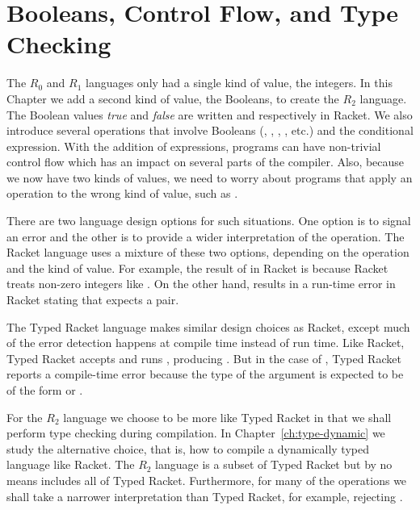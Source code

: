 \documentclass[11pt]{book}
\begin{document}
\chapter{Booleans, Control Flow, and Type Checking}
\label{ch:bool-types}

The $R_0$ and $R_1$ languages only had a single kind of value, the
integers. In this Chapter we add a second kind of value, the Booleans,
to create the $R_2$ language. The Boolean values \emph{true} and
\emph{false} are written  and  respectively in
Racket.  We also introduce several operations that involve Booleans
(, , , \key{<}, etc.) and the conditional
 expression. With the addition of  expressions,
programs can have non-trivial control flow which has an impact on
several parts of the compiler. Also, because we now have two kinds of
values, we need to worry about programs that apply an operation to the
wrong kind of value, such as .

There are two language design options for such situations.  One option
is to signal an error and the other is to provide a wider
interpretation of the operation. The Racket language uses a mixture of
these two options, depending on the operation and the kind of
value. For example, the result of  in Racket is
 because Racket treats non-zero integers like . On
the other hand,  results in a run-time error in Racket
stating that  expects a pair.

The Typed Racket language makes similar design choices as Racket,
except much of the error detection happens at compile time instead of
run time. Like Racket, Typed Racket accepts and runs ,
producing . But in the case of , Typed Racket
reports a compile-time error because the type of the argument is
expected to be of the form  or .

For the $R_2$ language we choose to be more like Typed Racket in that
we shall perform type checking during compilation. In
Chapter~\ref{ch:type-dynamic} we study the alternative choice, that
is, how to compile a dynamically typed language like Racket.  The
$R_2$ language is a subset of Typed Racket but by no means includes
all of Typed Racket. Furthermore, for many of the operations we shall
take a narrower interpretation than Typed Racket, for example,
rejecting .
\end{document}
